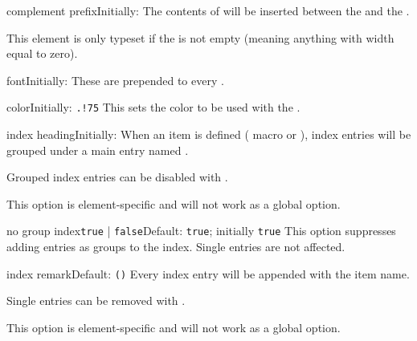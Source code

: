 \documentclass[11pt, outputdir = ./out]{article}
\begin{document}
\begin{Optiondef}{complement prefix}{}{Initially: }
    The contents of  will be inserted between the  and the .

    This element is only typeset if the  is not empty (meaning anything with width equal to zero).
\end{Optiondef}

\begin{Optiondef}{font}{}{Initially: }
    These  are prepended to every .
\end{Optiondef}

\begin{Optiondef}{color}{}{Initially: \texttt{.!75}}
    This sets the color to be used with the .
\end{Optiondef}

\begin{Optiondef}{index heading}{}{Initially: }
    When an item is defined ( macro or \hyperref[environmentdef]{}), index entries will be grouped under a main entry named .

    Grouped index entries can be disabled with .

    This option is element-specific and will not work as a global option.
\end{Optiondef}

\begin{Optiondef}{no group index}{\texttt{true} | \texttt{false}}{Default: \texttt{true}; initially \texttt{true}}
    This option suppresses adding entries as groups to the index. Single entries are not affected.
\end{Optiondef}

\begin{Optiondef}{index remark}{}{Default: \texttt{\DocsTilde()}}
    Every index entry will be appended with  the item name.

    Single entries can be removed with .

    This option is element-specific and will not work as a global option.
\end{Optiondef}
\end{document}
